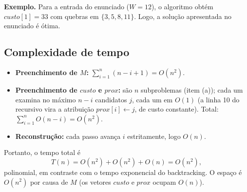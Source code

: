 \documentclass[11pt,a4paper]{article}
\begin{document}
\noindent\textbf{Exemplo.} Para a entrada do enunciado ($W=12$), o algoritmo
obtém $\mathit{custo}[1]=33$ com quebras em $\{3,5,8,11\}$. Logo, a solução
apresentada no enunciado é ótima.

\subsection{Complexidade de tempo}

\begin{itemize}
  \item \textbf{Preenchimento de $M$:} $\sum_{i=1}^{n}(n-i+1) = O(n^2)$.
  \item \textbf{Preenchimento de $\mathit{custo}$ e $\mathit{prox}$:} são $n$
        subproblemas (item (a)); cada um examina no máximo $n-i$ candidatos $j$,
        cada um em $O(1)$ (a linha 10 do recursivo vira a atribuição
        $\mathit{prox}[i]\gets j$, de custo constante). Total:
        $\sum_{i=1}^{n} O(n-i) = O(n^2)$.
  \item \textbf{Reconstrução:} cada passo avança $i$ estritamente, logo $O(n)$.
\end{itemize}
Portanto, o tempo total é
\[ T(n) = O(n^2) + O(n^2) + O(n) = O(n^2), \]
polinomial, em contraste com o tempo exponencial do backtracking. O espaço é
$O(n^2)$ por causa de $M$ (os vetores $\mathit{custo}$ e $\mathit{prox}$ ocupam $O(n)$).
\end{document}
